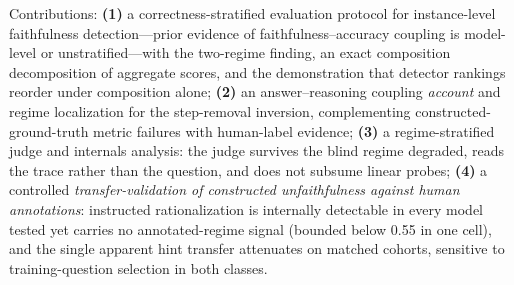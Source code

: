 \documentclass[11pt]{article}
\begin{document}
Contributions: \textbf{(1)} a correctness-stratified evaluation protocol for instance-level faithfulness detection---prior evidence of faithfulness--accuracy coupling is model-level \citep{bentham2024disguised} or unstratified---with the two-regime finding, an exact composition decomposition of aggregate scores, and the demonstration that detector rankings reorder under composition alone; \textbf{(2)} an answer--reasoning coupling \emph{account} and regime localization for the step-removal inversion, complementing constructed-ground-truth metric failures \citep{gurarieh2026bonafide,zaman2025causal} with human-label evidence; \textbf{(3)} a regime-stratified judge and internals analysis: the judge survives the blind regime degraded, reads the trace rather than the question, and does not subsume linear probes; \textbf{(4)} a controlled \emph{transfer-validation of constructed unfaithfulness against human annotations}: instructed rationalization \citep[cf.][]{offpolicy2025probes} is internally detectable in every model tested yet carries no annotated-regime signal (bounded below 0.55 in one cell), and the single apparent hint transfer attenuates on matched cohorts, sensitive to training-question selection in both classes.
\end{document}
